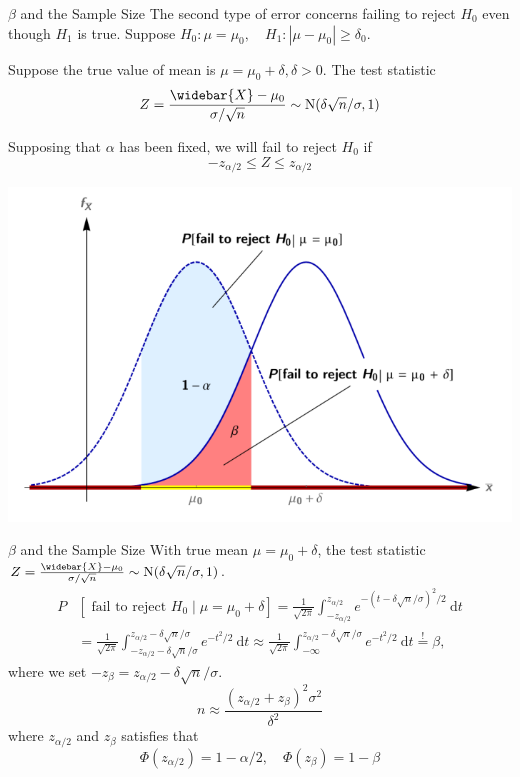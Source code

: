 \documentclass{beamer}
\begin{document}
\begin{frame}{$\beta$ and the Sample Size}
The second type of error concerns failing to reject $H_{0}$ even though $H_{1}$ is true. Suppose
$
H_{0}: \mu=\mu_{0}, \quad H_{1}:\left|\mu-\mu_{0}\right| \geq \delta_{0}
$.

Suppose the true value of mean is $\mu=\mu_{0}+\delta, \delta>0$. The test statistic
$$
Z=\frac{\widebar{X}-\mu_{0}}{\sigma / \sqrt{n}}
\sim\text{N}(\delta \sqrt{n} / \sigma,1)$$

Supposing that $\alpha$ has been fixed, we will fail to reject $H_{0}$ if
$$
-z_{\alpha / 2} \leq Z \leq z_{\alpha / 2}
$$
\begin{center}
\includegraphics[scale=0.36]{2.png}
\end{center}
\end{frame}

\begin{frame}{$\beta$ and the Sample Size}
With true mean $\mu=\mu_{0}+\delta$, the test statistic $Z=\frac{\widebar{X}-\mu_{0}}{\sigma / \sqrt{n}} \sim \mathrm{N}(\delta \sqrt{n} / \sigma, 1)$.
$$
\begin{aligned}
P&\left[\text { fail to reject } H_{0} \mid \mu=\mu_{0}+\delta\right] =\frac{1}{\sqrt{2 \pi}} \int_{-z_{\alpha / 2}}^{z_{\alpha / 2}} e^{-(t-\delta \sqrt{n} / \sigma)^{2} / 2} \mathrm{~d} t \\
&=\frac{1}{\sqrt{2 \pi}} \int_{-z_{\alpha / 2}-\delta \sqrt{n} / \sigma}^{z_{\alpha / 2}-\delta \sqrt{n} / \sigma} e^{-t^{2} / 2} \mathrm{~d} t  \approx \frac{1}{\sqrt{2 \pi}} \int_{-\infty}^{z_{\alpha / 2}-\delta \sqrt{n} / \sigma} e^{-t^{2} / 2} \mathrm{~d} t \stackrel{!}{=} \beta,
\end{aligned}
$$
where we set $-z_{\beta}=z_{\alpha / 2}-\delta \sqrt{n} / \sigma$.
$$
n \approx \frac{\left(z_{\alpha / 2}+z_{\beta}\right)^{2} \sigma^{2}}{\delta^{2}}
$$
where $z_{\alpha / 2}$ and $z_{\beta}$ satisfies that
$$
\Phi\left(z_{\alpha / 2}\right)=1-\alpha / 2, \quad \Phi\left(z_{\beta}\right)=1-\beta
$$
\end{frame}
\end{document}
